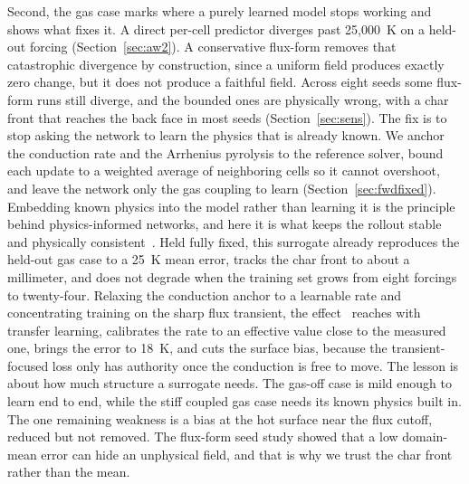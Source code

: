 \documentclass[conference]{IEEEtran}
\begin{document}
Second, the gas case marks where a purely learned model stops working and shows what
fixes it. A direct per-cell predictor diverges past 25{,}000~K on a held-out forcing
(Section~\ref{sec:aw2}). A conservative flux-form removes that catastrophic
divergence by construction, since a uniform field produces exactly zero change, but
it does not produce a faithful field. Across eight seeds some flux-form runs still
diverge, and the bounded ones are physically wrong, with a char front that reaches
the back face in most seeds (Section~\ref{sec:sens}). The fix is to stop asking the
network to learn the physics that is already known. We anchor the conduction rate
and the Arrhenius pyrolysis to the reference solver, bound each update to a weighted
average of neighboring cells so it cannot overshoot, and leave the network only the
gas coupling to learn (Section~\ref{sec:fwdfixed}). Embedding known physics into the
model rather than learning it is the principle behind physics-informed networks, and
here it is what keeps the rollout stable and physically consistent~\cite{cao2026}.
Held fully fixed, this surrogate already reproduces the held-out gas case to a 25~K
mean error, tracks the char front to about a millimeter, and does not degrade when
the training set grows from eight forcings to twenty-four. Relaxing the conduction
anchor to a learnable rate and concentrating training on the sharp flux transient,
the effect~\cite{cao2026} reaches with transfer learning, calibrates the rate to an
effective value close to the measured one, brings the error to 18~K, and cuts the
surface bias, because the transient-focused loss only has authority once the
conduction is free to move. The
lesson is about how much structure a surrogate needs. The gas-off case is mild
enough to learn end to end, while the stiff coupled gas case needs its known physics
built in. The one remaining weakness is a bias at the hot surface near the flux
cutoff, reduced but not removed. The flux-form seed study showed that a low
domain-mean error can hide an unphysical field, and that is why we trust the char
front rather than the mean.
\end{document}
